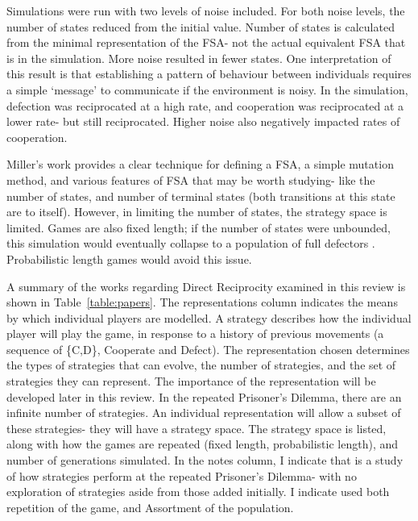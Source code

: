 \documentclass[a4paper,11pt,bcshonoursthesis,singlespace,twoside]{cssethesis}
\begin{document}
Simulations were run with two levels of noise included.  
For both noise levels, the number of states reduced from the initial value. 
Number of states is calculated from the minimal representation of the FSA- not the actual equivalent FSA that is in the simulation. 
More noise resulted in fewer states. 
One interpretation of this result is that establishing a pattern of behaviour between individuals requires a simple `message' to communicate if the environment is noisy. 
In the simulation, defection was reciprocated at a high rate, and cooperation was reciprocated at a lower rate- but still reciprocated. 
Higher noise also negatively impacted rates of cooperation. 

Miller's work provides a clear technique for defining a FSA, a simple mutation method, and various features of FSA that may be worth studying- like the number of states, and number of terminal states (both transitions at this state are to itself). However, in limiting the number of states, the strategy space is limited. Games are also fixed length; if the number of states were unbounded, this simulation would eventually collapse to a population of full defectors \citep{aumann1995backward}. Probabilistic length games would avoid this issue.

A summary of the works regarding Direct Reciprocity examined in this review is shown in Table~\ref{table:papers}. 
The representations column indicates the means by which individual players are modelled.  A strategy describes how the individual player will play the game, in response to a history of previous movements (a sequence of \{C,D\}, Cooperate and Defect). 
The representation chosen determines the types of strategies that can evolve, the number of strategies, and the set of strategies they can represent. The importance of the representation will be developed later in this review. 
In the repeated Prisoner's Dilemma, there are an infinite number of strategies. 
An individual representation will allow a subset of these strategies- they will have a strategy space. 
The strategy space is listed, along with how the games are repeated (fixed length, probabilistic length), and number of generations simulated. 
In the notes column, I indicate that \citet{axelrod:Science:1981} is a study of how strategies perform at the repeated Prisoner's Dilemma- with no exploration of strategies aside from those added initially. I indicate \citet{van-veelen:PNAS:2012} used both repetition of the game, and Assortment of the population. 
\end{document}
